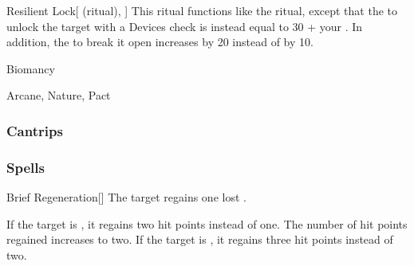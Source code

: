 \lowercase{\hypertarget{spell:Resilient Lock}{}}\label{spell:Resilient Lock}
\begin{attuneability}[Rank 5]{\hypertarget{spell:Resilient Lock}{Resilient Lock}}[ (ritual), ]
This ritual functions like the  ritual, except that the  to unlock the target with a Devices check is instead equal to 30 + your .
In addition, the  to break it open increases by 20 instead of by 10.
\end{attuneability}
\vspace{0.25em}


\newpage
\begin{spellsection}{Biomancy}

\begin{spellheader}
\end{spellheader}


 Arcane, Nature, Pact

\subsubsection{Cantrips}


\end{spellsection}


\subsubsection{Spells}


\lowercase{\hypertarget{spell:Brief Regeneration}{}}\label{spell:Brief Regeneration}
\begin{freeability}[Rank 1]{\hypertarget{spell:Brief Regeneration}{Brief Regeneration}}[]
The target regains one lost .

\rankline
{} If the target is , it regains two hit points instead of one.
 The number of hit points regained increases to two.
 If the target is , it regains three hit points instead of two.
\end{freeability}
\vspace{0.25em}



